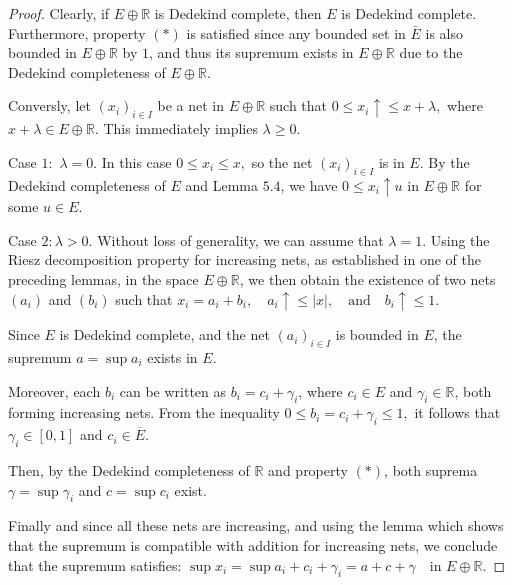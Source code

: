 \documentclass{birkau}
\numberwithin{equation}{section}
\theoremstyle{plain}
\theoremstyle{definition}
\begin{document}
\begin{proof}
	Clearly, if $E\oplus 
	\mathbb{R}
	$ is Dedekind complete, then $E$ is Dedekind complete. Furthermore, 
	property $\left( \ast \right) $ is satisfied since any bounded set in $\bar{E%
	}$ is also bounded in $E\oplus 
	\mathbb{R}
	$ by $1$, and thus its supremum exists in $E\oplus 
	\mathbb{R}
	$ due to the Dedekind completeness of $E\oplus 
	\mathbb{R}
	$.
	
	Conversly, let $\left( x_{i}\right) _{i\in I}$ be a net in $E\oplus 
	\mathbb{R}
	$ such that $0\leq x_{i}\uparrow \leq x+\lambda ,$ where $x+\lambda \in
	E\oplus 
	\mathbb{R}
	.$ This immediately implies $\lambda \geq 0.$
	
	Case $1:$ $\lambda =0.$ In this case $0\leq x_{i}\leq x,$ so the net $\left(
x_{i}\right) _{i\in I}$ is in $E$. By the Dedekind completeness of $E$ and Lemma $ 5.4 $,  we have $0\leq x_{i}\uparrow u$ in $E\oplus 
\mathbb{R}
$ for some $u\in E.$
	
	Case $2:\lambda >0.$ Without loss of generality, we can assume that \(\lambda = 1\). Using the Riesz decomposition property for increasing nets, as established in one of the preceding lemmas,  in the space \(E \oplus \mathbb{R}\), we then obtain the existence of two nets \((a_i)\) and \((b_i)\) such that
$x_i = a_i + b_i, \quad a_i \uparrow \leq |x|, \quad \text{and} \quad b_i \uparrow \leq 1.$

Since \(E\) is Dedekind complete, and the net \((a_i)_{i \in I}\) is bounded in \(E\), the supremum \(a = \sup a_i\) exists in \(E\).

Moreover, each \(b_i\) can be written as \(b_i = c_i + \gamma_i\), where \(c_i \in E\) and \(\gamma_i \in \mathbb{R}\), both forming increasing nets. From the inequality
$0 \leq b_i = c_i + \gamma_i \leq 1,$
it follows that \(\gamma_i \in [0,1]\) and \(c_i \in \overline{E}\).

Then, by the Dedekind completeness of \(\mathbb{R}\) and property \((\ast)\), both suprema \(\gamma = \sup \gamma_i\) and \(c = \sup c_i\) exist.

Finally and since all these nets are increasing, and using the lemma which shows that the supremum is compatible with addition for increasing nets, we conclude that the supremum satisfies:
$\sup x_i = \sup a_i + c_i +  \gamma_i = a + c + \gamma \quad \text{in } E \oplus \mathbb{R}.$
\end{proof}
\end{document}
